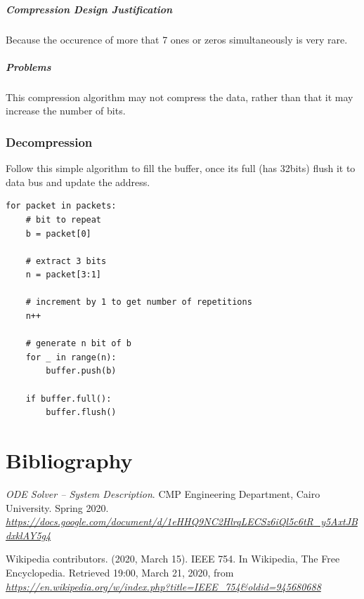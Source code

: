 \documentclass[12pt]{report}
\begin{document}
\subsubsection{Compression Design Justification}
Because the occurence of more that 7 ones or zeros simultaneously is very rare.

\subsubsection{Problems}
This compression algorithm may not compress the data, rather than that it may increase the number of bits.

\section{Decompression}
\label{sec:decomp}
Follow this simple algorithm to fill the buffer, once its full (has 32bits) flush it to data bus and update the address.

\begin{verbatim}
for packet in packets:
    # bit to repeat
    b = packet[0]

    # extract 3 bits
    n = packet[3:1]

    # increment by 1 to get number of repetitions
    n++

    # generate n bit of b
    for _ in range(n):
        buffer.push(b)

    if buffer.full():
        buffer.flush()
\end{verbatim}

\part{Bibliography}
\begin{thebibliography}{9}
    \textit{ODE Solver -- System Description}. CMP Engineering Department, Cairo University. Spring 2020.
    \\\textit{\url{https://docs.google.com/document/d/1eHHQ9NC2HlrqLECSz6iQl5c6tR_y5AxtJBdxklAY5g4}}

    Wikipedia contributors. (2020, March 15). IEEE 754. In Wikipedia, The Free Encyclopedia. Retrieved 19:00, March 21, 2020, from \\\textit{\url{https://en.wikipedia.org/w/index.php?title=IEEE_754&oldid=945680688}}
\end{thebibliography}
\end{document}
